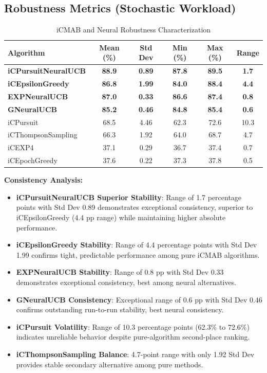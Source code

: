 \documentclass[12pt,a4paper]{article}
\newcommand{\secondarytext}[1]{\textcolor{secondaryblue}{\textbf{#1}}}
\newcommand{\success}[1]{\textcolor{accentgreen}{\textbf{#1}}}
\newcommand{\warning}[1]{\textcolor{warningred}{\textbf{#1}}}
\newcommand{\legacy}[1]{\textcolor{legacycolor}{\textbf{#1}}}
\newcommand{\neural}[1]{\textcolor{neuralcolor}{\textbf{#1}}}
\begin{document}
\subsection{Robustness Metrics (Stochastic Workload)}

\begin{table}[H]
\centering
\caption{iCMAB and Neural Robustness Characterization}
\label{tab:robustness}
\begin{tabular}{@{}lccccc@{}}
\toprule
\textbf{Algorithm} & \textbf{Mean (\%)} & \textbf{Std Dev} & \textbf{Min (\%)} & \textbf{Max (\%)} & \textbf{Range} \\
\midrule
\neural{iCPursuitNeuralUCB}   & \neural{88.9} & \neural{0.89} & \neural{87.8} & \neural{89.5} & \neural{1.7} \\
\success{iCEpsilonGreedy}   & \success{86.8} & \success{1.99} & \success{84.0} & \success{88.4} & \success{4.4} \\
\legacy{EXPNeuralUCB}       & \legacy{87.0} & \legacy{0.33} & \legacy{86.6} & \legacy{87.4} & \legacy{0.8} \\
\neural{GNeuralUCB}        & \neural{85.2} & \neural{0.46} & \neural{84.8} & \neural{85.4} & \neural{0.6} \\
iCPursuit                   & 68.5 & 4.46 & 62.3 & 72.6 & 10.3 \\
iCThompsonSampling          & 66.3 & 1.92 & 64.0 & 68.7 & 4.7 \\
iCEXP4                      & 37.1 & 0.29 & 36.7 & 37.4 & 0.7 \\
iCEpochGreedy               & 37.6 & 0.22 & 37.3 & 37.8 & 0.5 \\
\bottomrule
\end{tabular}
\end{table}

\textbf{Consistency Analysis:}
\begin{itemize}
\item \neural{iCPursuitNeuralUCB Superior Stability}: Range of 1.7 percentage points with Std Dev 0.89 demonstrates exceptional consistency, superior to iCEpsilonGreedy (4.4 pp range) while maintaining higher absolute performance.
\item \success{iCEpsilonGreedy Stability}: Range of 4.4 percentage points with Std Dev 1.99 confirms tight, predictable performance among pure iCMAB algorithms.
\item \legacy{EXPNeuralUCB Stability}: Range of 0.8 pp with Std Dev 0.33 demonstrates exceptional consistency, best among neural alternatives.
\item \neural{GNeuralUCB Consistency}: Exceptional range of 0.6 pp with Std Dev 0.46 confirms outstanding run-to-run stability, best neural consistency.
\item \warning{iCPursuit Volatility}: Range of 10.3 percentage points (62.3\% to 72.6\%) indicates unreliable behavior despite pure-algorithm second-place ranking.
\item \secondarytext{iCThompsonSampling Balance}: 4.7-point range with only 1.92 Std Dev provides stable secondary alternative among pure methods.
\end{itemize}
\end{document}
